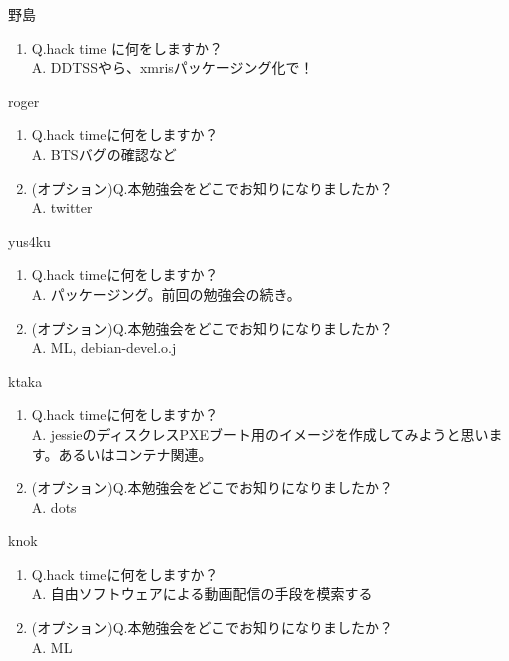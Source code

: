 \begin{prework}{ 野島 }
  \begin{enumerate}
  \item Q.hack time に何をしますか？\\
    A. DDTSSやら、xmrisパッケージング化で！
  \end{enumerate}
\end{prework}

\begin{prework}{ roger  }
  \begin{enumerate}
  \item Q.hack timeに何をしますか？\\
    A. BTSバグの確認など
  \item (オプション)Q.本勉強会をどこでお知りになりましたか？\\
    A. twitter
    \end{enumerate}
\end{prework}

\begin{prework}{ yus4ku }
  \begin{enumerate}
  \item Q.hack timeに何をしますか？\\
    A. パッケージング。前回の勉強会の続き。
  \item (オプション)Q.本勉強会をどこでお知りになりましたか？\\
    A. ML, debian-devel\@d.o.j
  \end{enumerate}
\end{prework}

\begin{prework}{ ktaka }
  \begin{enumerate}
  \item Q.hack timeに何をしますか？\\
    A. jessieのディスクレスPXEブート用のイメージを作成してみようと思います。あるいはコンテナ関連。
  \item (オプション)Q.本勉強会をどこでお知りになりましたか？\\
    A. dots
  \end{enumerate}
\end{prework}

\begin{prework}{ knok }
  \begin{enumerate}
  \item Q.hack timeに何をしますか？\\
    A. 自由ソフトウェアによる動画配信の手段を模索する
  \item (オプション)Q.本勉強会をどこでお知りになりましたか？\\
    A. ML
  \end{enumerate}
\end{prework}


